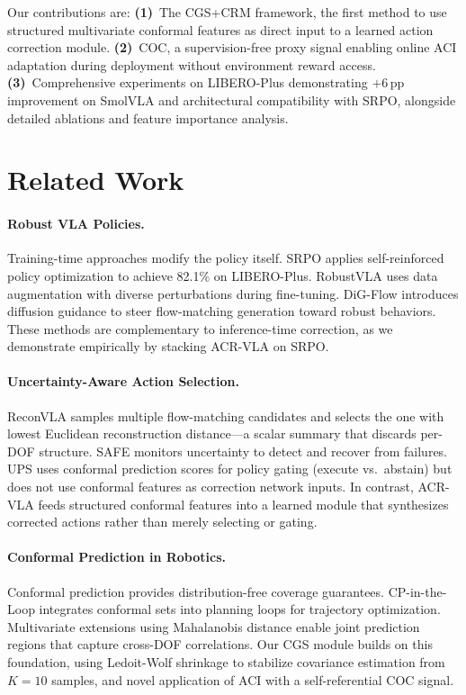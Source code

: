 \documentclass[10pt,twocolumn]{article}
\begin{document}
Our contributions are:
\textbf{(1)}~The CGS+CRM framework, the first method to use structured multivariate conformal features as direct input to a learned action correction module.
\textbf{(2)}~COC, a supervision-free proxy signal enabling online ACI adaptation during deployment without environment reward access.
\textbf{(3)}~Comprehensive experiments on LIBERO-Plus demonstrating $+6$\,pp improvement on SmolVLA and architectural compatibility with SRPO, alongside detailed ablations and feature importance analysis.

\section{Related Work}
\label{sec:related}

\paragraph{Robust VLA Policies.}
Training-time approaches modify the policy itself.
SRPO applies self-reinforced policy optimization to achieve 82.1\% on LIBERO-Plus.
RobustVLA uses data augmentation with diverse perturbations during fine-tuning.
DiG-Flow introduces diffusion guidance to steer flow-matching generation toward robust behaviors.
These methods are complementary to inference-time correction, as we demonstrate empirically by stacking ACR-VLA on SRPO.

\paragraph{Uncertainty-Aware Action Selection.}
ReconVLA samples multiple flow-matching candidates and selects the one with lowest Euclidean reconstruction distance---a scalar summary that discards per-DOF structure.
SAFE monitors uncertainty to detect and recover from failures.
UPS uses conformal prediction scores for policy gating (execute vs.\ abstain) but does not use conformal features as correction network inputs.
In contrast, ACR-VLA feeds structured conformal features into a learned module that synthesizes corrected actions rather than merely selecting or gating.

\paragraph{Conformal Prediction in Robotics.}
Conformal prediction provides distribution-free coverage guarantees.
CP-in-the-Loop integrates conformal sets into planning loops for trajectory optimization.
Multivariate extensions using Mahalanobis distance enable joint prediction regions that capture cross-DOF correlations.
Our CGS module builds on this foundation, using Ledoit-Wolf shrinkage to stabilize covariance estimation from $K{=}10$ samples, and novel application of ACI with a self-referential COC signal.
\end{document}
